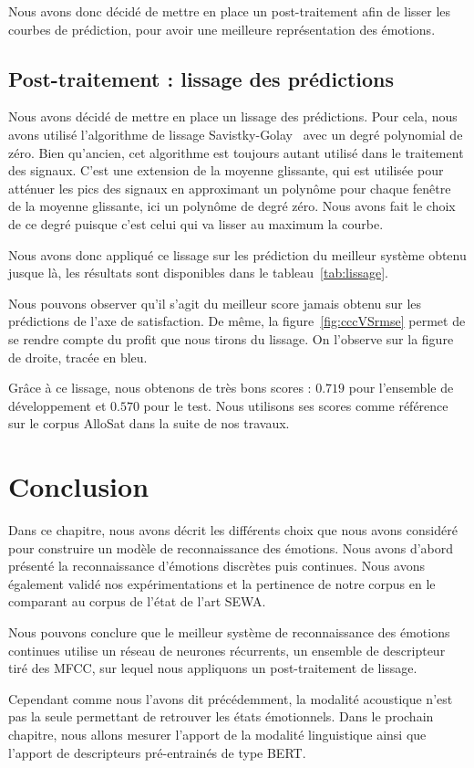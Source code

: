 

Nous avons donc décidé de mettre en place un post-traitement afin de lisser les courbes de prédiction, pour avoir une meilleure représentation des émotions.

\subsection{Post-traitement : lissage des prédictions}
Nous avons décidé de mettre en place un lissage des prédictions. Pour cela, nous avons utilisé l'algorithme de lissage Savistky-Golay~\cite{Savitzky1964} avec un degré polynomial de zéro. Bien qu'ancien, cet algorithme est toujours autant utilisé dans le traitement des signaux. C'est une extension de la moyenne glissante, qui est utilisée pour atténuer les pics des signaux en approximant un polynôme pour chaque fenêtre de la moyenne glissante, ici un polynôme de degré zéro. Nous avons fait le choix de ce degré puisque c'est celui qui va lisser au maximum la courbe.

Nous avons donc appliqué ce lissage sur les prédiction du meilleur système obtenu jusque là, les résultats sont disponibles dans le tableau~\ref{tab:lissage}.



Nous pouvons observer qu'il s'agit du meilleur score jamais obtenu sur les prédictions de l'axe de satisfaction. De même, la figure~\ref{fig:cccVSrmse} permet de se rendre compte du profit que nous tirons du lissage. On l'observe sur la figure de droite, tracée en bleu.

Grâce à ce lissage, nous obtenons de très bons scores : $0.719$ pour l'ensemble de développement et $0.570$ pour le test. Nous utilisons ses scores comme référence sur le corpus AlloSat dans la suite de nos travaux.%


\section{Conclusion}
Dans ce chapitre, nous avons décrit les différents choix que nous avons considéré pour construire un modèle de reconnaissance des émotions. Nous avons d'abord présenté la reconnaissance d'émotions discrètes puis continues. Nous avons également validé nos expérimentations et la pertinence de notre corpus en le comparant au corpus de l'état de l'art SEWA.

Nous pouvons conclure que le meilleur système de reconnaissance des émotions continues utilise un réseau de neurones récurrents, un ensemble de descripteur tiré des MFCC, sur lequel nous appliquons un post-traitement de lissage.

Cependant comme nous l'avons dit précédemment, la modalité acoustique n'est pas la seule permettant de retrouver les états émotionnels. Dans le prochain chapitre, nous allons mesurer l'apport de la modalité linguistique ainsi que l'apport de descripteurs pré-entrainés de type BERT.
